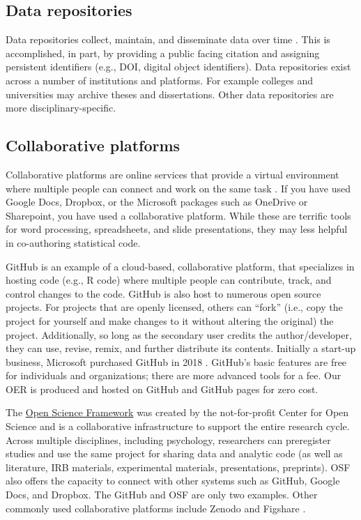 \documentclass[
  11pt,
]{book}
\begin{document}
\hypertarget{data-repositories}{%
\subsection{Data repositories}\label{data-repositories}}

Data repositories collect, maintain, and disseminate data over time \citep{alter_responsible_2018}. This is accomplished, in part, by providing a public facing citation and assigning persistent identifiers (e.g., DOI, digital object identifiers). Data repositories exist across a number of institutions and platforms. For example colleges and universities may archive theses and dissertations. Other data repositories are more disciplinary-specific.

\hypertarget{collaborative-platforms}{%
\subsection{Collaborative platforms}\label{collaborative-platforms}}

Collaborative platforms are online services that provide a virtual environment where multiple people can connect and work on the same task \citep{bezjak_open_2018}. If you have used Google Docs, Dropbox, or the Microsoft packages such as OneDrive or Sharepoint, you have used a collaborative platform. While these are terrific tools for word processing, spreadsheets, and slide presentations, they may less helpful in co-authoring statistical code.

GitHub \citep{noauthor_github_2022} is an example of a cloud-based, collaborative platform, that specializes in hosting code (e.g., R code) where multiple people can contribute, track, and control changes to the code. GitHub is also host to numerous open source projects. For projects that are openly licensed, others can ``fork'' (i.e., copy the project for yourself and make changes to it without altering the original) the project. Additionally, so long as the secondary user credits the author/developer, they can use, revise, remix, and further distribute its contents. Initially a start-up business, Microsoft purchased GitHub in 2018 \href{“GitHub,”\%202022b}{\citet{noauthor_github_2022-1}}. GitHub's basic features are free for individuals and organizations; there are more advanced tools for a fee. Our OER is produced and hosted on GitHub and GitHub pages for zero cost.

The \href{OSF;\%20https://osf.io/}{Open Science Framework} \citep{osf_open_2022} was created by the not-for-profit Center for Open Science and is a collaborative infrastructure to support the entire research cycle. Across multiple disciplines, including psychology, researchers can preregister studies and use the same project for sharing data and analytic code (as well as literature, IRB materials, experimental materials, presentations, preprints). OSF also offers the capacity to connect with other systems such as GitHub, Google Docs, and Dropbox. The GitHub and OSF are only two examples. Other commonly used collaborative platforms include Zenodo and Figshare \citep{martone_data_2018}.
\end{document}

